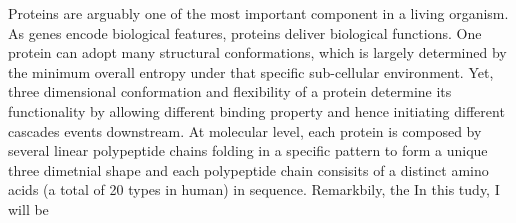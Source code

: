 Proteins are arguably one of the most important component in a living organism. As genes encode biological features, proteins deliver biological functions. One protein can adopt many structural conformations, which is largely determined by the minimum overall entropy under that specific sub-cellular environment. Yet, three dimensional conformation and flexibility of a protein determine its functionality by allowing different binding property and hence initiating different cascades events downstream. At molecular level, each protein is composed by several linear polypeptide chains folding in a specific pattern to form a unique three dimetnial shape and each polypeptide chain consisits of a distinct amino acids (a total of 20 types in human) in sequence. Remarkbily, the  In this tudy, I will be 